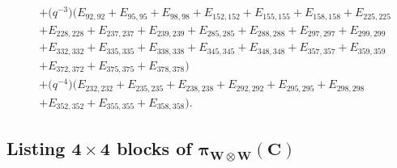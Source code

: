 \documentclass[pdftex]{sigma}
\numberwithin{equation}{section}
\theoremstyle{definition}
\begin{document}
\begin{align*}
&+\bigl(q^{-3}\bigr)(E_{92,92}+E_{95,95}+E_{98,98}+E_{152,152}+E_{155,155}+E_{158,158}+E_{225,225}\\
&+E_{228,228}+E_{237,237}+E_{239,239}+E_{285,285}+E_{288,288}+E_{297,297}+E_{299,299}\\
&+E_{332,332}+E_{335,335}+E_{338,338}+E_{345,345}+E_{348,348}+E_{357,357}+E_{359,359}\\
&+E_{372,372}+E_{375,375}+E_{378,378})\\
&+\bigl(q^{-4}\bigr)(E_{232,232}+E_{235,235}+E_{238,238}+E_{292,292}+E_{295,295}+E_{298,298}\\
&+E_{352,352}+E_{355,355}+E_{358,358}).
\end{align*}

\subsection[Listing 4 times 4 blocks of pi\_\{W otimes W\}(C)]{Listing $\boldsymbol{4 \times 4}$ blocks of $\boldsymbol{\pi_{W \otimes W}(C)}$}
\label{4x4blocks}
\end{document}
